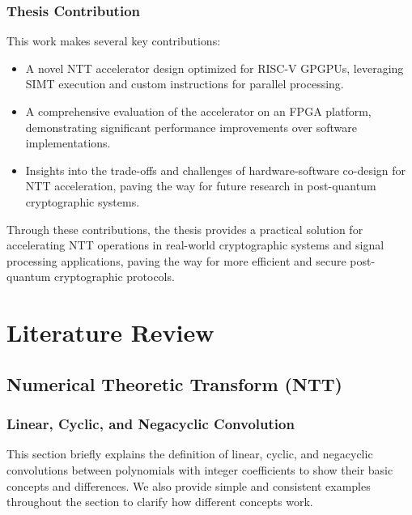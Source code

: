 \documentclass[12pt]{report}
\begin{document}
\section{Thesis Contribution}

This work makes several key contributions:
\begin{itemize}
    \item A novel NTT accelerator design optimized for RISC-V GPGPUs, leveraging SIMT execution and custom instructions for parallel processing.
    \item A comprehensive evaluation of the accelerator on an FPGA platform, demonstrating significant performance improvements over software implementations.
    \item Insights into the trade-offs and challenges of hardware-software co-design for NTT acceleration, paving the way for future research in post-quantum cryptographic systems.
\end{itemize}
Through these contributions, the thesis provides a practical solution for accelerating NTT operations in real-world cryptographic systems and signal processing applications, paving the way for more efficient and secure post-quantum cryptographic protocols.

\newpage

\part{Literature Review}

\chapter{Numerical Theoretic Transform (NTT)}

\section{Linear, Cyclic, and Negacyclic Convolution}

This section briefly explains the definition of linear, cyclic, and negacyclic convolutions between polynomials with integer coefficients to show their basic concepts and differences. We also provide simple and consistent examples throughout the section to clarify how different concepts work. 
\end{document}
